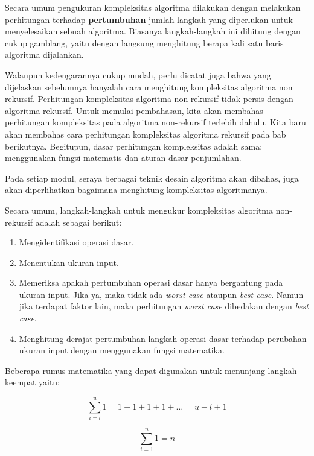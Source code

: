Secara umum pengukuran kompleksitas algoritma dilakukan dengan melakukan perhitungan terhadap \textbf{pertumbuhan} jumlah langkah yang diperlukan untuk menyelesaikan sebuah algoritma. Biasanya langkah-langkah ini dihitung dengan cukup gamblang, yaitu dengan langsung menghitung berapa kali satu baris algoritma dijalankan.

Walaupun kedengarannya cukup mudah, perlu dicatat juga bahwa yang dijelaskan sebelumnya hanyalah cara menghitung kompleksitas algoritma non rekursif. Perhitungan kompleksitas algoritma non-rekursif tidak persis dengan algoritma rekursif. Untuk memulai pembahasan, kita akan membahas perhitungan kompleksitas pada algoritma non-rekursif terlebih dahulu. Kita baru akan membahas cara perhitungan kompleksitas algoritma rekursif pada bab berikutnya. Begitupun, dasar perhitungan kompleksitas adalah sama: menggunakan fungsi matematis dan aturan dasar penjumlahan.

Pada setiap modul, seraya berbagai teknik desain algoritma akan dibahas, juga akan diperlihatkan bagaimana menghitung kompleksitas algoritmanya. 

Secara umum, langkah-langkah untuk mengukur kompleksitas algoritma non-rekursif adalah sebagai berikut:

\begin{enumerate}
    \item Mengidentifikasi operasi dasar.
    \item Menentukan ukuran input.
    \item Memeriksa apakah pertumbuhan operasi dasar hanya bergantung pada ukuran input. Jika ya, maka tidak ada \textit{worst case} ataupun \textit{best case}. Namun jika terdapat faktor lain, maka perhitungan \textit{worst case} dibedakan dengan \textit{best case}.
    \item Menghitung derajat pertumbuhan langkah operasi dasar terhadap perubahan ukuran input dengan menggunakan fungsi matematika.
\end{enumerate}

Beberapa rumus matematika yang dapat digunakan untuk menunjang langkah keempat yaitu:

\begin{equation}\label{eq:common-1}
    \sum\limits_{i=l}^u 1 = 1 + 1 + 1 + 1 + \ldots = u - l + 1
\end{equation}

\begin{equation}\label{eq:common-2}
    \sum\limits_{i=1}^n 1 = n
\end{equation}


